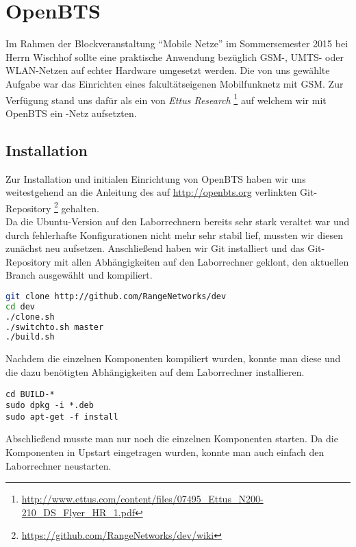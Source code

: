 \section{OpenBTS}
\label{sec:openbts}


Im Rahmen der Blockveranstaltung ``Mobile Netze'' im Sommersemester 2015 bei Herrn Wischhof sollte eine praktische Anwendung bezüglich GSM-, UMTS- oder WLAN-Netzen auf echter Hardware umgesetzt werden. Die von uns gewählte Aufgabe war das Einrichten eines fakultätseigenen Mobilfunknetz mit GSM.
Zur Verfügung stand uns dafür als \SDR ein \USRP von \emph{Ettus Research} \footnote{\url{http://www.ettus.com/content/files/07495_Ettus_N200-210_DS_Flyer_HR_1.pdf}} auf welchem wir mit OpenBTS ein \GSM-Netz aufsetzten.

\subsection{Installation}
\label{sec:installation}

Zur Installation und initialen Einrichtung von OpenBTS haben wir uns weitestgehend an die Anleitung des auf \url{http://openbts.org} verlinkten Git-Repository \footnote{\url{https://github.com/RangeNetworks/dev/wiki}} gehalten.\\Da die Ubuntu-Version auf den Laborrechnern bereits sehr stark veraltet war und durch fehlerhafte Konfigurationen nicht mehr sehr stabil lief, mussten wir diesen zunächst neu aufsetzen. Anschließend haben wir Git installiert und das Git-Repository mit allen
Abhängigkeiten auf den Laborrechner geklont, den aktuellen Branch ausgewählt und kompiliert.

\begin{lstlisting}[language=bash]
git clone http://github.com/RangeNetworks/dev
cd dev
./clone.sh
./switchto.sh master
./build.sh
\end{lstlisting}

Nachdem die einzelnen Komponenten kompiliert wurden, konnte man diese und die dazu benötigten Abhängigkeiten auf dem Laborrechner installieren.

\begin{lstlisting}
cd BUILD-*
sudo dpkg -i *.deb
sudo apt-get -f install
\end{lstlisting}

Abschließend musste man nur noch die einzelnen Komponenten starten. Da die Komponenten in Upstart eingetragen wurden, konnte man auch einfach den Laborrechner neustarten.

